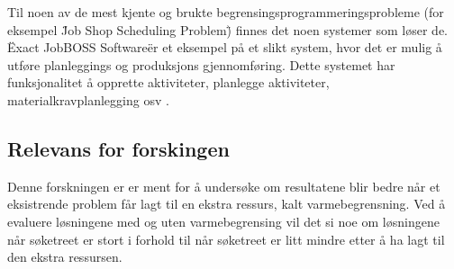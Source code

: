 Til noen av de mest kjente og brukte begrensingsprogrammeringsprobleme (for eksempel \"Job Shop Scheduling Problem\") finnes det noen systemer som løser de. \"Exact JobBOSS Software\" er et eksempel på et slikt system, hvor det er mulig å utføre planleggings og produksjons gjennomføring. Dette systemet har funksjonalitet å opprette aktiviteter, planlegge aktiviteter, materialkravplanlegging osv \cite{exact}.

\subsection{Relevans for forskingen}
Denne forskningen er er ment for å undersøke om resultatene blir bedre når et eksistrende problem får lagt til en ekstra ressurs, kalt varmebegrensning. Ved å evaluere løsningene med og uten varmebegrensing vil det si noe om løsningene når søketreet er stort i forhold til når søketreet er litt mindre etter å ha lagt til den ekstra ressursen.